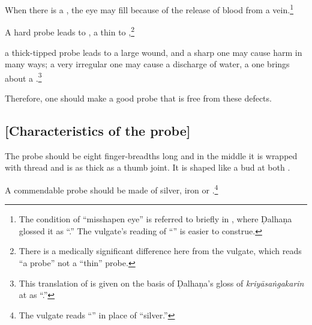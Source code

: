 \begin{translation}
    
    \item[64] 
    
    When there is a , the eye may fill because of the
    release of blood from a vein.\footnote{The condition of “misshapen eye” is referred
    to briefly in , where Ḍalhaṇa glossed it as
    “.”  The vulgate's reading of “” is easier to construe.}
    
    
    A hard probe leads to , a thin to
    ,\footnote{There is a medically
    significant difference here from the vulgate, which reads “a 
    probe” not a “thin” probe.}
    
    \item[65]
    
    a thick-tipped probe leads to a large wound, and a sharp one may cause harm in many 
    ways;
    a very irregular one may cause a discharge of water, a  one brings about 
    a .\footnote{This translation of  is given on the basis of Ḍalhaṇa's gloss of \emph{kriyāsaṅgakarin} at 
    as “.”}
    
    \item[66]
    
    Therefore, one should make a good probe that is free from these defects.
    
\end{translation}

\subsection{[Characteristics of the probe]}

\begin{translation}
    
    \item[\empty ] 
    The probe should be eight finger-breadths long and in the middle it is wrapped with thread 
    and is as thick as a thumb joint.  It is shaped like a bud at both .
    
    \item[67]
    
    A commendable probe should be made of silver, iron or 
    .\footnote{The vulgate reads “” in place of 
    “silver.”}
    
    
\end{translation}

